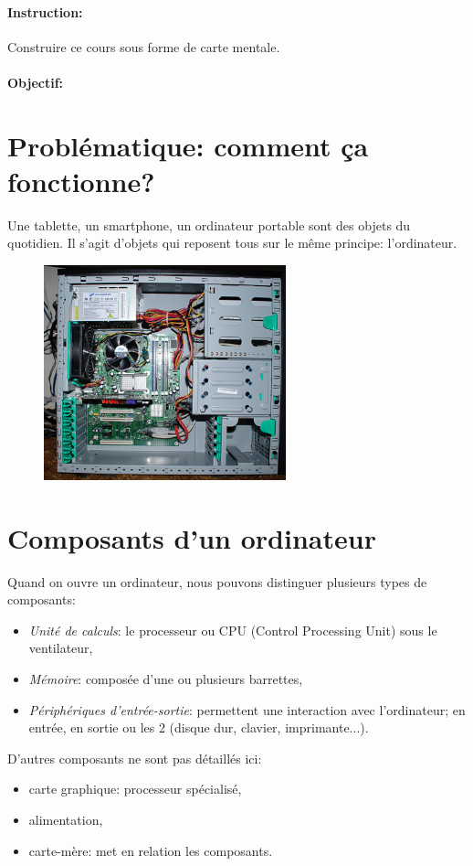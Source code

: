 \documentclass[a4paper,11pt]{article}
\begin{document}
\begin{Form}
\begin{commentprof}
\paragraph{Instruction:} Construire ce cours sous forme de carte mentale.
\end{commentprof}
\paragraph{Objectif:}
\section{Problématique: comment ça fonctionne?}
Une tablette, un smartphone, un ordinateur portable sont des objets du quotidien. Il s'agit d'objets qui reposent tous sur le même principe: l'ordinateur.
\begin{figure}[!h]
\centering
\includegraphics[width=7cm]{ressources/inside-pc.jpg}
\label{inside}
\end{figure}
\begin{center}
\end{center}
\section{Composants d'un ordinateur}
Quand on ouvre un ordinateur, nous pouvons distinguer plusieurs types de composants:
\begin{itemize}
\item \emph{Unité de calculs}: le processeur ou CPU (Control Processing Unit) sous le ventilateur,
\item \emph{Mémoire}: composée d'une ou plusieurs barrettes,
\item \emph{Périphériques d'entrée-sortie}: permettent une interaction avec l'ordinateur; en entrée, en sortie ou les 2 (disque dur, clavier, imprimante...).
\end{itemize}
D'autres composants ne sont pas détaillés ici:
\begin{itemize}
\item carte graphique: processeur spécialisé,
\item alimentation,
\item carte-mère: met en relation les composants.
\end{itemize}

\end{Form}
\end{document}
